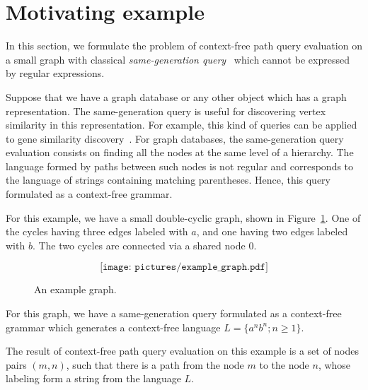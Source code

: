 \section{Motivating example}
In this section, we formulate the problem of context-free path query evaluation on a small graph with classical \textit{same-generation query}~\cite{FndDB} which cannot be expressed by regular expressions.

Suppose that we have a graph database or any other object which has a graph representation. The same-generation query is useful for discovering vertex similarity in this representation. For example, this kind of queries can be applied to gene similarity discovery~\cite{GraphQueryWithEarley}. For graph databases, the same-generation query evaluation consists on finding all the nodes at the same level of a hierarchy. The language formed by paths between such nodes is not regular and corresponds to the language of strings containing matching parentheses. Hence, this query formulated as a context-free grammar.

For this example, we have a small double-cyclic graph, shown in Figure~\ref{Example_Graph}. One of the cycles having three edges labeled with $a$, and one having two edges labeled with $b$. The two cycles are connected via
a shared node $0$.

\begin{figure}[h]
	\[
	\texttt{[image: pictures/example\_graph.pdf]}
	\]
	\caption{An example graph.}
	\label{Example_Graph}
\end{figure}

For this graph, we have a same-generation query formulated as a context-free grammar which generates a context-free language $L=\{a^n b^n; n \geq 1\}$.

The result of context-free path query evaluation on this example is a set of nodes pairs $(m, n)$, such that there is a path from the node $m$ to the node $n$, whose labeling form a string from the language $L$.